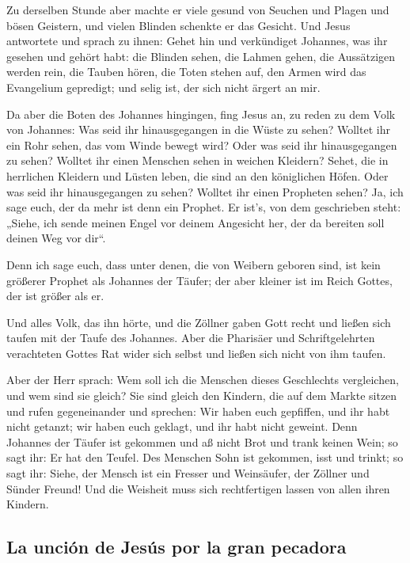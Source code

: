  Zu derselben Stunde aber machte er viele gesund von
Seuchen und Plagen und bösen Geistern, und vielen Blinden schenkte er
das Gesicht.  Und Jesus antwortete und sprach zu ihnen:
Gehet hin und verkündiget Johannes, was ihr gesehen und gehört habt: die
Blinden sehen, die Lahmen gehen, die Aussätzigen werden rein, die Tauben
hören, die Toten stehen auf, den Armen wird das Evangelium gepredigt;
 und selig ist, der sich nicht ärgert an mir.

 Da aber die Boten des Johannes hingingen, fing Jesus an,
zu reden zu dem Volk von Johannes: Was seid ihr hinausgegangen in die
Wüste zu sehen? Wolltet ihr ein Rohr sehen, das vom Winde bewegt wird?
 Oder was seid ihr hinausgegangen zu sehen? Wolltet ihr
einen Menschen sehen in weichen Kleidern? Sehet, die in herrlichen
Kleidern und Lüsten leben, die sind an den königlichen Höfen.
 Oder was seid ihr hinausgegangen zu sehen? Wolltet ihr
einen Propheten sehen? Ja, ich sage euch, der da mehr ist denn ein
Prophet.  Er ist's, von dem geschrieben steht: „Siehe,
ich sende meinen Engel vor deinem Angesicht her, der da bereiten soll
deinen Weg vor dir``.

 Denn ich sage euch, dass unter denen, die von Weibern
geboren sind, ist kein größerer Prophet als Johannes der Täufer; der
aber kleiner ist im Reich Gottes, der ist größer als er.

 Und alles Volk, das ihn hörte, und die Zöllner gaben
Gott recht und ließen sich taufen mit der Taufe des Johannes.
 Aber die Pharisäer und Schriftgelehrten verachteten
Gottes Rat wider sich selbst und ließen sich nicht von ihm taufen.

 Aber der Herr sprach: Wem soll ich die Menschen dieses
Geschlechts vergleichen, und wem sind sie gleich?  Sie
sind gleich den Kindern, die auf dem Markte sitzen und rufen
gegeneinander und sprechen: Wir haben euch gepfiffen, und ihr habt nicht
getanzt; wir haben euch geklagt, und ihr habt nicht geweint.
 Denn Johannes der Täufer ist gekommen und aß nicht Brot
und trank keinen Wein; so sagt ihr: Er hat den Teufel. 
Des Menschen Sohn ist gekommen, isst und trinkt; so sagt ihr: Siehe, der
Mensch ist ein Fresser und Weinsäufer, der Zöllner und Sünder Freund!
 Und die Weisheit muss sich rechtfertigen lassen von
allen ihren Kindern.

\hypertarget{la-unciuxf3n-de-jesuxfas-por-la-gran-pecadora}{%
\subsection{La unción de Jesús por la gran
pecadora}\label{la-unciuxf3n-de-jesuxfas-por-la-gran-pecadora}}

